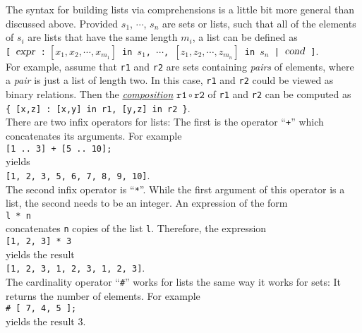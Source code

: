 The syntax for building lists via comprehensions is a little bit more
general than discussed above.  Provided $s_1$, $\cdots$, $s_n$ are sets or lists,
such that all of the elements of $s_i$ are lists that have the same length $m_i$, a list 
can be defined as
\\[0.2cm]
\hspace*{1.3cm}
\texttt{[ $\textsl{expr}$ :$\;[x_1,x_2,\cdots,x_{m_1}]$ in $s_1$, $\cdots$, $[z_1,z_2,\cdots, z_{m_n}]$ in $s_n$ | $\textsl{cond}$ ]}.
\\[0.2cm]
For example, assume that \texttt{r1} and \texttt{r2} are sets containing \emph{pairs} of elements, where a
\emph{pair} is just a list of length two.  In this case, \texttt{r1} and \texttt{r2} could be viewed as binary
relations.  Then the 
\href{http://en.wikipedia.org/wiki/Binary_relation}{\emph{composition}} $\mathtt{r1} \circ \mathtt{r2}$ of \texttt{r1} and
\texttt{r2} can be computed as
\\[0.2cm]
\hspace*{1.3cm}
\texttt{\{ [x,z] : [x,y] in r1, [y,z] in r2 \}}.
\\[0.2cm] 
There are two infix operators for lists: The first is the operator ``\texttt{+}'' which
concatenates its arguments.  For example
\\[0.2cm]
\hspace*{1.3cm}
\texttt{[1 .. 3] + [5 .. 10];}
\\[0.2cm]
yields 
\\[0.2cm]
\hspace*{1.3cm}
\texttt{[1, 2, 3, 5, 6, 7, 8, 9, 10]}.
\\[0.2cm]
The second infix operator is ``\texttt{*}''.  While the first argument of this operator is
a list, the second  needs to be an integer.  An expression of the form
\\[0.2cm]
\hspace*{1.3cm}
\texttt{l * n}
\\[0.2cm]
concatenates \texttt{n} copies of the list \texttt{l}.  Therefore, the expression
\\[0.2cm]
\hspace*{1.3cm}
\texttt{[1, 2, 3] * 3}
\\[0.2cm]
yields the result
\\[0.2cm]
\hspace*{1.3cm}
\texttt{[1, 2, 3, 1, 2, 3, 1, 2, 3]}.
\\[0.2cm]
The cardinality operator ``\texttt{\#}'' works for lists the same way it works for sets:
It returns the number of elements.  For example 
\\[0.2cm]
\hspace*{1.3cm}
\texttt{\# [ 7, 4, 5 ];}
\\[0.2cm]
yields the result $3$.

